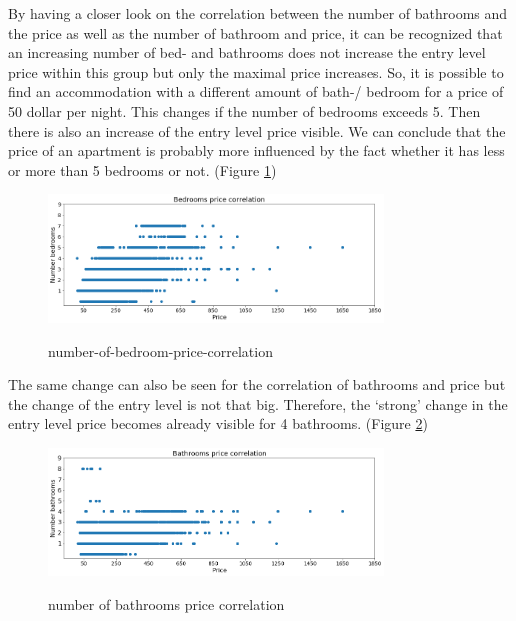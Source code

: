 By having a closer look on the correlation between the number of bathrooms and the price as well as the number of bathroom and price, it can be recognized that an increasing number of bed- and bathrooms does not increase the entry level price within this group but only the maximal price increases. So, it is possible to find an accommodation with a different amount of bath-/ bedroom for a price of 50 dollar per night. This changes if the number of bedrooms exceeds 5. Then there is also an increase of the entry level price visible. We can conclude that the price of an apartment is probably more influenced by the fact whether it has less or more than 5 bedrooms or not. (Figure \ref{bedroom-price-correlation})
\begin{figure}
  \begin{center}
  \includegraphics[width=3.5in]{photo/10_bedrooms_price_correlation.png}\\
  \caption{number-of-bedroom-price-correlation}\label{bedroom-price-correlation}
  \end{center}
\end{figure}
The same change can also be seen for the correlation of bathrooms and price but the change of the entry level is not that big. Therefore, the ‘strong’ change in the entry level price becomes already visible for 4 bathrooms. (Figure \ref{bathrooms-price-correlation})
\begin{figure}
  \begin{center}
  \includegraphics[width=3.5in]{photo/9_bathroom_price_correlation.png}\\
  \caption{number of bathrooms price correlation}\label{bathrooms-price-correlation}
  \end{center}
\end{figure}

